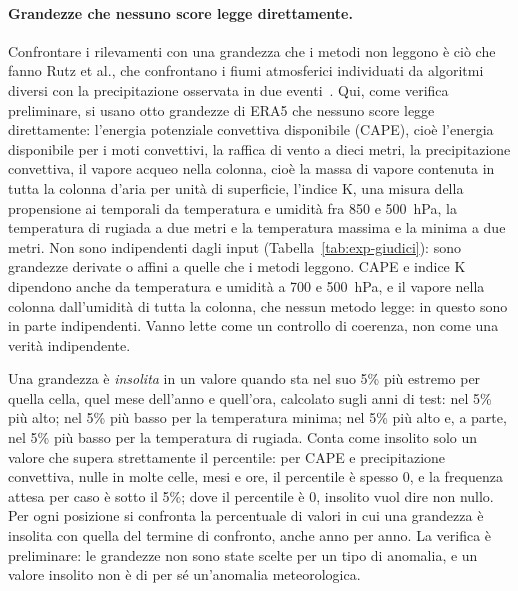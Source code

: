 \paragraph{Grandezze che nessuno score legge direttamente.} Confrontare i rilevamenti con una grandezza che i metodi non leggono è ciò che fanno Rutz et al., che confrontano i fiumi atmosferici individuati da algoritmi diversi con la precipitazione osservata in due eventi~\cite{rutz2019artmip}. Qui, come verifica preliminare, si usano otto grandezze di ERA5 che nessuno score legge direttamente: l'energia potenziale convettiva disponibile (CAPE), cioè l'energia disponibile per i moti convettivi, la raffica di vento a dieci metri, la precipitazione convettiva, il vapore acqueo nella colonna, cioè la massa di vapore contenuta in tutta la colonna d'aria per unità di superficie, l'indice K, una misura della propensione ai temporali da temperatura e umidità fra 850 e 500~hPa, la temperatura di rugiada a due metri e la temperatura massima e la minima a due metri. Non sono indipendenti dagli input (Tabella~\ref{tab:exp-giudici}): sono grandezze derivate o affini a quelle che i metodi leggono. CAPE e indice K dipendono anche da temperatura e umidità a 700 e 500~hPa, e il vapore nella colonna dall'umidità di tutta la colonna, che nessun metodo legge: in questo sono in parte indipendenti. Vanno lette come un controllo di coerenza, non come una verità indipendente.

Una grandezza è \emph{insolita} in un valore quando sta nel suo 5\% più estremo per quella cella, quel mese dell'anno e quell'ora, calcolato sugli anni di test: nel 5\% più alto; nel 5\% più basso per la temperatura minima; nel 5\% più alto e, a parte, nel 5\% più basso per la temperatura di rugiada. Conta come insolito solo un valore che supera strettamente il percentile: per CAPE e precipitazione convettiva, nulle in molte celle, mesi e ore, il percentile è spesso 0, e la frequenza attesa per caso è sotto il 5\%; dove il percentile è 0, insolito vuol dire non nullo. Per ogni posizione si confronta la percentuale di valori in cui una grandezza è insolita con quella del termine di confronto, anche anno per anno. La verifica è preliminare: le grandezze non sono state scelte per un tipo di anomalia, e un valore insolito non è di per sé un'anomalia meteorologica.

